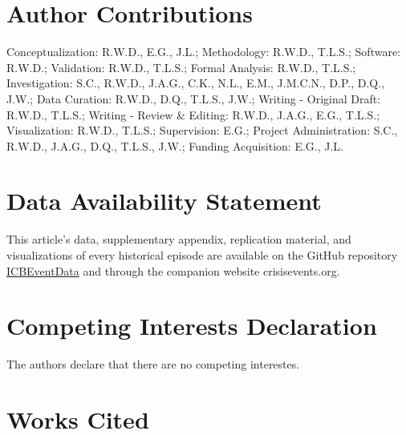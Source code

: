 \documentclass{article}
\begin{document}
\hypertarget{author-contributions}{%
\section{Author Contributions}\label{author-contributions}}

Conceptualization: R.W.D., E.G., J.L.; Methodology: R.W.D., T.L.S.;
Software: R.W.D.; Validation: R.W.D., T.L.S.; Formal Analysis: R.W.D.,
T.L.S.; Investigation: S.C., R.W.D., J.A.G., C.K., N.L., E.M., J.M.C.N.,
D.P., D.Q., J.W.; Data Curation: R.W.D., D.Q., T.L.S., J.W.; Writing -
Original Draft: R.W.D., T.L.S.; Writing - Review \& Editing: R.W.D.,
J.A.G., E.G., T.L.S.; Visualization: R.W.D., T.L.S.; Supervision: E.G.;
Project Administration: S.C., R.W.D., J.A.G., D.Q., T.L.S., J.W.;
Funding Acquisition: E.G., J.L.

\hypertarget{data-availability-statement}{%
\section{Data Availability
Statement}\label{data-availability-statement}}

This article's data, supplementary appendix, replication material, and
visualizations of every historical episode are available on the GitHub
repository
\href{https://urldefense.com/v3/__https://github.com/CenterForPeaceAndSecurityStudies/ICBEventData__;!!Mih3wA!WxDJtEczKfxGTh0S2Krunap8ReymFEL5iTWaSfOHeqlSdyfRx77zmjBSWO1OAm13$}{ICBEventData}
and through the companion website crisisevents.org.

\hypertarget{competing-interests-declaration}{%
\section{Competing Interests
Declaration}\label{competing-interests-declaration}}

The authors declare that there are no competing interestes.

\clearpage

\hypertarget{works-cited}{%
\section*{Works Cited}\label{works-cited}}
\end{document}
